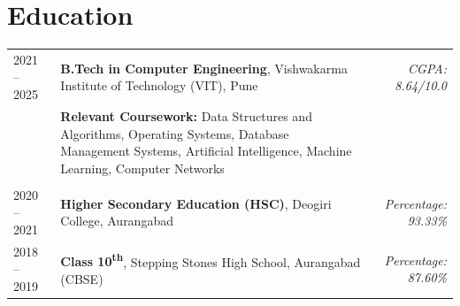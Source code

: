 \documentclass{article}
\begin{document}
\section{Education}
\begin{tabularx}{\linewidth}{@{}l X r@{}}
2021 -- 2025 & \textbf{B.Tech in Computer Engineering}, Vishwakarma Institute of Technology (VIT), Pune & \textit{CGPA: 8.64/10.0} \\
& \textbf{Relevant Coursework:} Data Structures and Algorithms, Operating Systems, Database Management Systems, Artificial Intelligence, Machine Learning, Computer Networks & \\
\\
2020 -- 2021 & \textbf{Higher Secondary Education (HSC)}, Deogiri College, Aurangabad & \textit{Percentage: 93.33\%} \\
2018 -- 2019 & \textbf{Class 10\textsuperscript{th}}, Stepping Stones High School, Aurangabad (CBSE) & \textit{Percentage: 87.60\%} \\
\end{tabularx}
\end{document}
